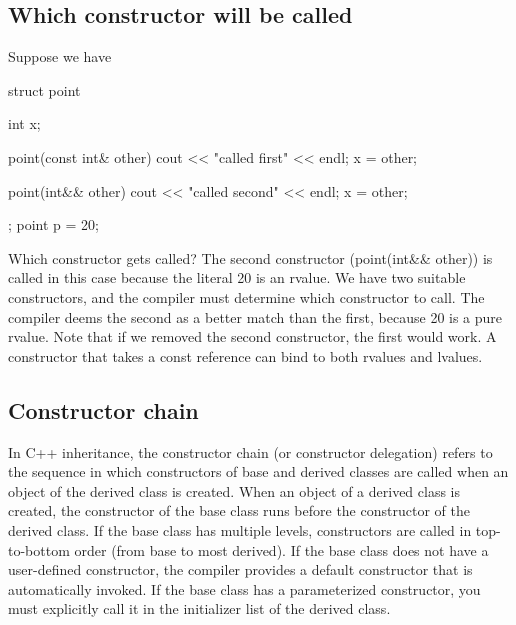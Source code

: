 \documentclass{report}
\begin{document}
    \subsection{Which constructor will be called}
    \bigbreak \noindent 
    Suppose we have
    \bigbreak \noindent 
    \begin{cppcode}
        struct  point {
            int x{};

            point(const int& other) {
                cout << "called first" << endl;
                x = other;
            }

            point(int&& other) {
                cout << "called second" << endl;
                x = other;
            }
        };
        point p = 20;
    \end{cppcode}
    \bigbreak \noindent 
    Which constructor gets called? The second constructor (point(int\&\& other)) is called in this case because the literal 20 is an rvalue.
    \bigbreak \noindent 
    We have two suitable constructors, and the compiler must determine which constructor to call.
    \bigbreak \noindent 
    The compiler  deems the second as a better match than the first, because 20 is a pure rvalue. Note that if we removed the second constructor, the first would work. A constructor that takes a const reference can bind to both rvalues and lvalues.
    



    \pagebreak 
    \bigbreak \noindent 
    \subsection{Constructor chain}
    \bigbreak \noindent 
    In C++ inheritance, the constructor chain (or constructor delegation) refers to the sequence in which constructors of base and derived classes are called when an object of the derived class is created.
    \bigbreak \noindent 
    When an object of a derived class is created, the constructor of the base class runs before the constructor of the derived class.
    \bigbreak \noindent 
    If the base class has multiple levels, constructors are called in top-to-bottom order (from base to most derived).
    \bigbreak \noindent 
    If the base class does not have a user-defined constructor, the compiler provides a default constructor that is automatically invoked.
    \bigbreak \noindent 
    If the base class has a parameterized constructor, you must explicitly call it in the initializer list of the derived class.
    \bigbreak \noindent 
\end{document}
